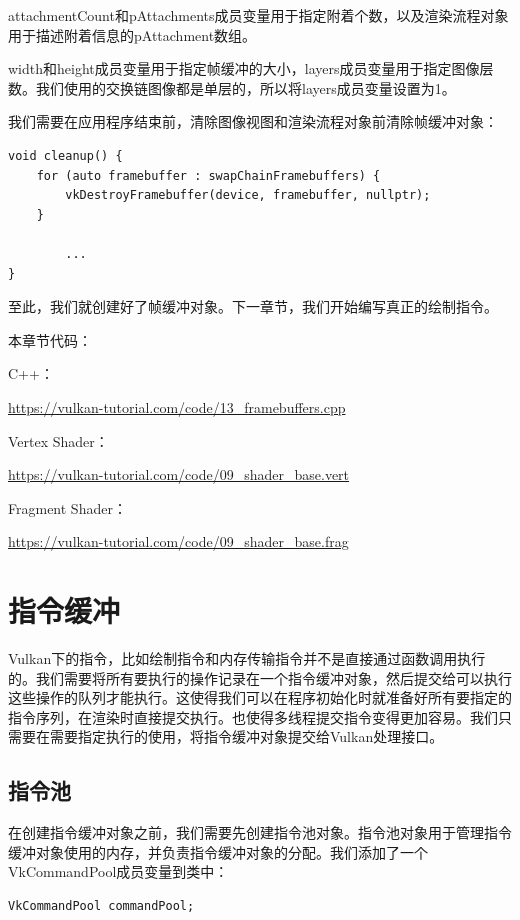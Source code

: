 \documentclass{ctexart}
\begin{document}
attachmentCount和pAttachments成员变量用于指定附着个数，以及渲染流程对象用于描述附着信息的pAttachment数组。

width和height成员变量用于指定帧缓冲的大小，layers成员变量用于指定图像层数。我们使用的交换链图像都是单层的，所以将layers成员变量设置为1。

我们需要在应用程序结束前，清除图像视图和渲染流程对象前清除帧缓冲对象：

\begin{lstlisting}[language={[ANSI]C}]
void cleanup() {
	for (auto framebuffer : swapChainFramebuffers) {
		vkDestroyFramebuffer(device, framebuffer, nullptr);
	}

		...
}
\end{lstlisting}

至此，我们就创建好了帧缓冲对象。下一章节，我们开始编写真正的绘制指令。

本章节代码：

C++：

\url{https://vulkan-tutorial.com/code/13_framebuffers.cpp}

Vertex Shader：

\url{https://vulkan-tutorial.com/code/09_shader_base.vert}

Fragment Shader：

\url{https://vulkan-tutorial.com/code/09_shader_base.frag}

\newpage
\section{指令缓冲}

Vulkan下的指令，比如绘制指令和内存传输指令并不是直接通过函数调用执行的。我们需要将所有要执行的操作记录在一个指令缓冲对象，然后提交给可以执行这些操作的队列才能执行。这使得我们可以在程序初始化时就准备好所有要指定的指令序列，在渲染时直接提交执行。也使得多线程提交指令变得更加容易。我们只需要在需要指定执行的使用，将指令缓冲对象提交给Vulkan处理接口。

\subsection{指令池}

在创建指令缓冲对象之前，我们需要先创建指令池对象。指令池对象用于管理指令缓冲对象使用的内存，并负责指令缓冲对象的分配。我们添加了一个VkCommandPool成员变量到类中：

\begin{lstlisting}[language={[ANSI]C}]
VkCommandPool commandPool;
\end{lstlisting}
\end{document}
